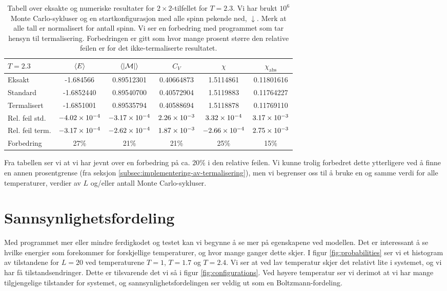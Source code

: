 \documentclass[11pt]{article}
\newcommand{\abs}[1]{|#1|}
\begin{document}
\begin{table}
\centering
\caption{Tabell over eksakte og numeriske resultater for $2\times
  2$-tilfellet for $T=2.3$. Vi har brukt $10^6$ Monte Carlo-sykluser og
  en startkonfigurasjon med alle spinn pekende ned, $\downarrow$. Merk at
alle tall er normalisert for antall spinn. Vi ser en forbedring
med programmet som tar hensyn til termalisering. Forbedringen er gitt
som hvor mange prosent større den relative feilen er for det
ikke-termaliserte resultatet.}
\label{tab:exact-numerical-improved}
\vspace{0.1cm}
\begin{tabular}{l|ccccc}
$T=2.3$ & $\langle E \rangle$ & $\mean{ \abs{\mathcal{M} } }$ & $C_V$ & $\chi$ & $\chi_\text{abs}$ \\
\hline
Eksakt          & -1.684566     & 0.89512301    & 0.40664873   & 1.5114861 & 0.11801616 \\
Standard        & -1.6852440    & 0.89540700    & 0.40572904   & 1.5119883 & 0.11764227 \\
Termalisert     & -1.6851001    & 0.89535794    & 0.40588694   & 1.5118878 & 0.11769110\\
Rel. feil std.  & $-4.02\times 10^{-4}$ & $-3.17\times 10^{-4}$ & $2.26\times 10^{-3}$ & $3.32\times 10^{-4}$ & $3.17\times 10^{-3}$ \\
Rel. feil term. & $-3.17\times 10^{-4}$ & $-2.62\times 10^{-4}$ & $1.87\times 10^{-3}$ &
                                                                 $-2.66\times 10^{-4}$ & $2.75\times 10^{-3}$\\
Forbedring  & 27\% & 21\% & 21\% & 25\% & 15\%
\end{tabular}
\end{table}

Fra tabellen ser vi at vi har jevnt over en forbedring på ca. $20\%$ i
den relative feilen. Vi kunne trolig forbedret dette ytterligere ved å
finne en annen prosentgrense (fra seksjon
\ref{subsec:implementering-av-termalisering}), men vi begrenser oss
til å bruke en og samme verdi for alle temperaturer, verdier av
$L$ og/eller antall Monte Carlo-sykluser. 

\section{Sannsynlighetsfordeling}
Med programmet mer eller mindre ferdigkodet og testet kan vi begynne
å se mer på egenskapene ved modellen. Det er interessant å se hvilke
energier som forekommer for forskjellige temperaturer, og hvor mange ganger dette skjer.
I figur \ref{fig:probabilities} ser vi et histogram av tilstandene
for $L=20$ ved temperaturene $T=1$, $T=1.7$ og $T=2.4$. Vi ser at ved lav temperatur
skjer det relativt lite i systemet, og vi har få tilstandsendringer. 
Dette er tilsvarende
det vi så i figur \ref{fig:configurations}. Ved høyere temperatur ser vi derimot
at vi har mange tilgjengelige tilstander for systemet, og 
sannsynlighetsfordelingen ser veldig ut som en Boltzmann-fordeling.
\end{document}
